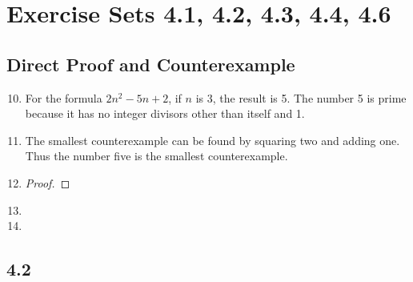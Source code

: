 \documentclass[12pt]{article}
\begin{document}

\setcounter{section}{4}
\section*{Exercise Sets 4.1, 4.2, 4.3, 4.4, 4.6}
\subsection{Direct Proof and Counterexample}
\begin{enumerate}
  \setcounter{enumi}{9}
\item %
For the formula $2n^{2}-5n+2$, if $n$ is 3, the result is 5. The
number 5 is prime because it has no integer divisors other than itself
and 1.
  \setcounter{enumi}{11}
\item %
The smallest counterexample can be found by squaring two and adding
one. Thus the number five is the smallest counterexample.
  \setcounter{enumi}{29}
\item %
\begin{proof}
  
\end{proof}
\item %

  \setcounter{enumi}{57}
\item %

\end{enumerate}

\subsection{4.2}
\end{document}
